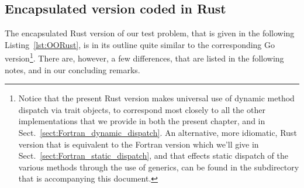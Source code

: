 \documentclass[11pt,oneside]{report}
\newcommand{\code}[1]{{\selectfont\ttfamily{#1}}}
\begin{document}
\subsection{Encapsulated version coded in Rust}
\label{sect:OORust}

The encapsulated Rust version of our test problem, that is given in the
following Listing~\ref{lst:OORust}, is in its outline quite similar to
the corresponding Go version\footnote{Notice that the present Rust
version makes universal use of dynamic method dispatch via trait
objects, to correspond most closely to all the other
implementations that we provide in both the present chapter, and in
Sect.~\ref{sect:Fortran_dynamic_dispatch}. An alternative, more
idiomatic, Rust version that is equivalent to the Fortran version
which we'll give in Sect.~\ref{sect:Fortran_static_dispatch}, and that
effects static dispatch of the various \code{sum} methods through the
use of generics, can be found in the \code{Code} subdirectory that is
accompanying this document.}. There are, however, a few differences,
that are listed in the following notes, and in our concluding remarks.
\end{document}
